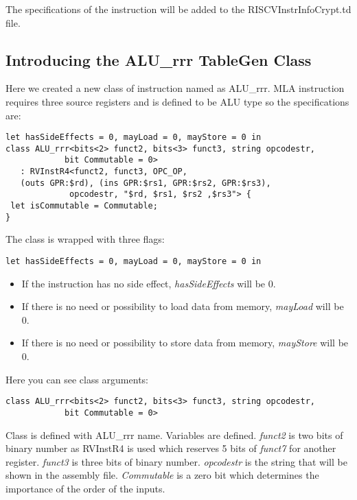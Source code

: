 The specifications of the instruction will be added to the RISCVInstrInfoCrypt.td file.

\subsection{Introducing the ALU\_rrr TableGen Class}\label{sec:alurrr}

Here we created a new class of instruction named as ALU\_rrr. MLA instruction requires three source registers and is defined to be ALU type so the specifications are:

\begin{lstlisting}[caption={ALU\_rrr class definition},label={lst:ALU_rrr}]
let hasSideEffects = 0, mayLoad = 0, mayStore = 0 in
class ALU_rrr<bits<2> funct2, bits<3> funct3, string opcodestr,
            bit Commutable = 0>
   : RVInstR4<funct2, funct3, OPC_OP, 
   (outs GPR:$rd), (ins GPR:$rs1, GPR:$rs2, GPR:$rs3),
             opcodestr, "$rd, $rs1, $rs2 ,$rs3"> {
 let isCommutable = Commutable;
}
\end{lstlisting}
The class is wrapped with three flags:
\begin{lstlisting}
let hasSideEffects = 0, mayLoad = 0, mayStore = 0 in
\end{lstlisting}

\begin{itemize}
    \item If the instruction has no side effect, \textit{hasSideEffects} will be 0.
    \item If there is no need or possibility to load data from memory, \textit{mayLoad} will be 0.
    \item If there is no need or possibility to store data from memory, \textit{mayStore} will be 0.
\end{itemize}


Here you can see class arguments:
\begin{lstlisting}
class ALU_rrr<bits<2> funct2, bits<3> funct3, string opcodestr,
            bit Commutable = 0>
\end{lstlisting}

Class is defined with ALU\_rrr name. Variables are defined. \textit{funct2} is two bits of binary number as RVInstR4 is used which reserves 5 bits of \textit{funct7} for another register. \textit{funct3} is three bits of binary number. \textit{opcodestr} is the string that will be shown in the assembly file. \textit{Commutable} is a zero bit which determines the importance of the order of the inputs.

